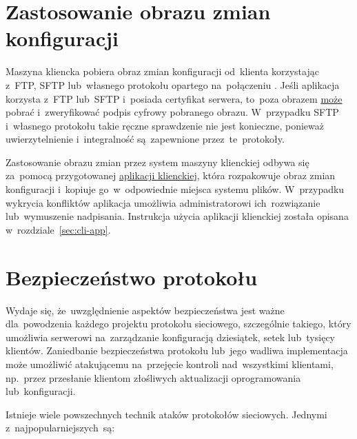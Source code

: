 \documentclass[thesis]{subfiles}
\begin{document}

\section{Zastosowanie obrazu zmian konfiguracji}
\label{sec:zastosowanie-obrazu-konfiguracji}

Maszyna kliencka pobiera obraz zmian konfiguracji od~klienta korzystając z~FTP, SFTP lub~własnego protokołu opartego na~połączeniu . Jeśli aplikacja korzysta z~FTP lub~SFTP i~posiada certyfikat serwera, to~poza obrazem \href{https://superuser.com/a/426345/139893}{może} pobrać i~zweryfikować podpis cyfrowy pobranego obrazu. W~przypadku SFTP i~własnego protokołu takie ręczne sprawdzenie nie jest konieczne, ponieważ uwierzytelnienie i~integralność są~zapewnione przez~te~protokoły.

Zastosowanie obrazu zmian przez system maszyny klienckiej odbywa się za~pomocą przygotowanej \hyperref[sec:cli-app]{aplikacji klienckiej}, która rozpakowuje obraz zmian konfiguracji i~kopiuje go~w~odpowiednie miejsca systemu plików. W~przypadku wykrycia konfliktów aplikacja umożliwia administratorowi ich~rozwiązanie lub~wymuszenie nadpisania. Instrukcja użycia aplikacji klienckiej została opisana w~rozdziale~\ref{sec:cli-app}.


\section{Bezpieczeństwo protokołu}
\label{sec:security}

Wydaje się, że~uwzględnienie aspektów bezpieczeństwa jest ważne dla~powodzenia każdego projektu protokołu sieciowego, szczególnie takiego, który umożliwia serwerowi na~zarządzanie konfiguracją dziesiątek, setek lub~tysięcy klientów. Zaniedbanie bezpieczeństwa protokołu lub~jego wadliwa implementacja może umożliwić atakującemu na~przejęcie kontroli nad~wszystkimi klientami, np.~przez przesłanie klientom złośliwych aktualizacji oprogramowania lub~konfiguracji.

Istnieje wiele powszechnych technik ataków protokołów sieciowych. Jednymi z~najpopularniejszych~są:\mynobreakpar
\end{document}
